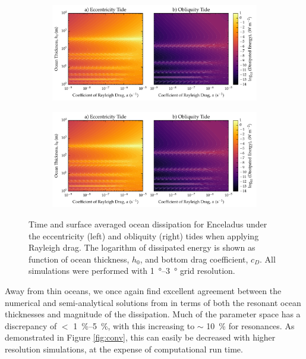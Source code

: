 \begin{figure}[!t]
    \centering
    \begin{subfigure}[t]{0.95\linewidth} %
        \includegraphics[width=\linewidth]{Figures/enceladus_linear}
        \label{fig:lincEccEncel}
    \end{subfigure}
    \begin{subfigure}[t]{0\linewidth} %
         \includegraphics[width=\linewidth]{Figures/enceladus_linear}
         \label{fig:linObliqEncel} 
    \end{subfigure}
    \vspace{-0.5cm}
\caption{Time and surface averaged ocean dissipation for Enceladus under the eccentricity (left) and obliquity (right) tides when applying Rayleigh drag. The logarithm of dissipated energy is shown as function of ocean thickness, $h_0$, and bottom drag coefficient, $c_D$. All simulations were performed with \SIrange{1}{3}{\degree} grid resolution. \label{fig:linEncel}}
\end{figure}

Away from thin oceans, we once again find excellent agreement between the numerical and semi-analytical solutions from \citet{matsuyama2014tidal} in terms of both the resonant ocean thicknesses and magnitude of the dissipation. Much of the parameter space has a discrepancy of $<$ \SIrange{1}{5}{\percent}, with this increasing to $\sim$ \SI{10}{\percent} for resonances. As demonstrated in Figure \ref{fig:conv}, this can easily be decreased with higher resolution simulations, at the expense of computational run time.

